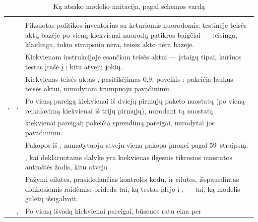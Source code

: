 \begin{xltabular}{\textwidth}{@{}L{33mm}L{39mm}Y@{}}
\caption{Ką atsako modelio imitacija, pagal schemos vardą}\label{tab:testing:fake}\\
\toprule
{} &  &  \\
\midrule
\endfirsthead
\toprule
{} &  &  \\
\midrule
\endhead
\bottomrule
\endlastfoot
{} &  &
Fiksuotas politikos inventorius su keturiomis  nuorodomis: testinėje teisės aktų
bazėje po vieną kiekvienai nuorodų patikros baigčiai --- teisinga, klaidinga, tokio straipsnio
nėra, teisės akto nėra bazėje. \\
 &  &
Kiekvienam instrukcijoje esančiam teisės aktui --- įstaigų tipai, kuriuos testas įrašė į
; kitu atveju jokių. \\
 &  &
Kiekvienas teisės aktas , pasitikėjimas 0,9, poveikis ;
 pakeičia laukus teisės aktui, nurodytam trumpuoju pavadinimu. \\
,  & ,
 &
Po vieną pareigą kiekvienai iš dviejų pirmųjų paketo nuostatų (po vieną reikalavimą
kiekvienai iš trijų pirmųjų), nurodant tą nuostatą. \\
 &  &
 kiekvienai pareigai;  pakeičia sprendimą pareigai, nurodytai jos
pavadinimu. \\
 &  &
Pakopos iš ; numatytuoju atveju viena pakopa įmonei pagal 59~straipsnį. \\
 &  &
, kai deklaruotame dalyke yra kiekvienas ilgesnis tikrosios nuostatos antraštės
žodis, kitu atveju . \\
 &  &
Pažymi eilutes, prasidedančias kontrolės kodu, ir eilutes, išspausdintas didžiosiomis
raidėmis; prideda tai, ką testas įdėjo į , --- tai, ką modelis galėtų
išsigalvoti. \\
 & ,  &
Po vieną išvadą kiekvienai pareigai, būsenos ratu eina per 

\end{xltabular}
